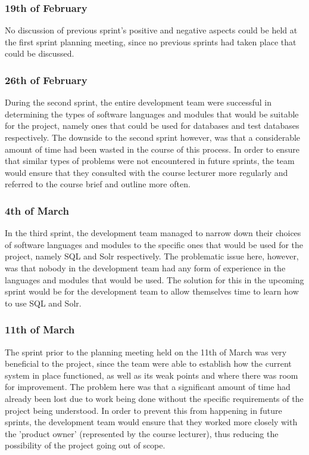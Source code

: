 \documentclass[journal]{IEEEtran}
\begin{document}
\subsubsection{19th of February}

No discussion of previous sprint's positive and negative aspects could be held at the first sprint planning meeting, since no previous sprints had taken place that could be discussed.
\\

\subsubsection{26th of February}

During the second sprint, the entire development team were successful in determining the types of software languages and modules that would be suitable for the project, namely ones that could be used for databases and test databases respectively. The downside to the second sprint however, was that a considerable amount of time had been wasted in the course of this process. In order to ensure that similar types of problems were not encountered in future sprints, the team would ensure that they consulted with the course lecturer more regularly and referred to the course brief and outline more often.
\\

\subsubsection{4th of March}

In the third sprint, the development team managed to narrow down their choices of software languages and modules to the specific ones that would be used for the project, namely SQL and Solr respectively. The problematic issue here, however, was that nobody in the development team had any form of experience in the languages and modules that would be used. The solution for this in the upcoming sprint would be for the development team to allow themselves time to learn how to use SQL and Solr.
\\

\subsubsection{11th of March}

The sprint prior to the planning meeting held on the 11th of March was very beneficial to the project, since the team were able to establish how the current system in place functioned, as well as its weak points and where there was room for improvement. The problem here was that a significant amount of time had already been lost due to work being done without the specific requirements of the project being understood. In order to prevent this from happening in future sprints, the development team would ensure that they worked more closely with the 'product owner' (represented by the course lecturer), thus reducing the possibility of the project going out of scope.
\\
\end{document}
